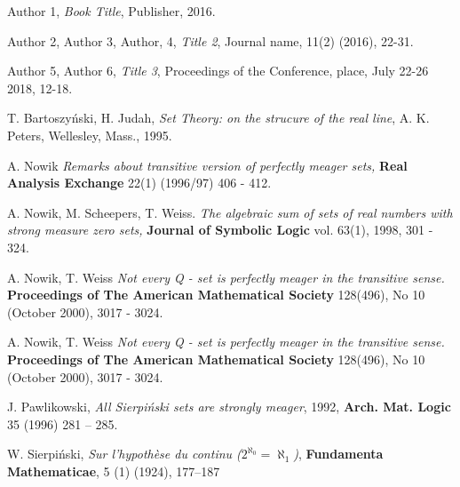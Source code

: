 \documentclass[b5cutpaper, twoside, 11pt, leqno]{moravica}
\theoremstyle{definition}
\begin{document}



\begin{thebibliography}{99}  %
\setlength{\itemsep}{6pt}

 Author 1, \textit{Book Title}, Publisher, 2016.

 Author 2, Author 3, Author, 4, \textit{Title 2}, Journal name, 11(2) (2016), 22-31.

 Author 5, Author 6, \textit{Title 3}, Proceedings of the Conference, place, July 22-26 2018, 12-18.


 T. Bartoszy\'nski, H. Judah, \textit{Set Theory: on the
strucure of the real line}, A. K. Peters, Wellesley, Mass., 1995.

A. Nowik
{\em Remarks about transitive version of perfectly
meager sets,}
{\bf Real Analysis Exchange} 22(1) (1996/97) 406 - 412.

A. Nowik, M. Scheepers, T. Weiss.
{\em The algebraic sum of sets of
    real numbers with strong measure zero sets,}
{\bf Journal of Symbolic Logic} vol. 63(1), 1998, 301 - 324.

A. Nowik, T. Weiss
{\em Not every Q - set is perfectly meager in the transitive sense.}
{\bf Proceedings of The American Mathematical Society} 128(496), No 10
(October 2000), 3017 - 3024.

A. Nowik, T. Weiss
{\em Not every Q - set is perfectly meager in the transitive sense.}
{\bf Proceedings of The American Mathematical Society} 128(496), No 10
(October 2000), 3017 - 3024.

J. Pawlikowski, {\em All Sierpi\'nski sets are strongly
meager}, 1992, {\bf Arch. Mat. Logic} 35 (1996) 281 -- 285.

W. Sierpi\'nski, {\em Sur l'hypoth\`{e}se du continu 
($2^{\aleph_0} = \aleph_1$)}, {\bf Fundamenta Mathematicae}, 5 (1)
(1924), 177–187
\end{thebibliography}
\end{document}
